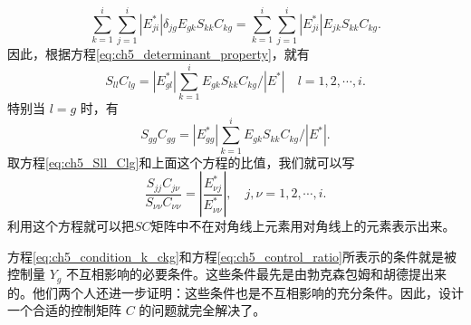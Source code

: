 \begin{equation*}
\sum_{k=1}^{i} \sum_{j=1}^{i} \left| E_{ji}^* \right| \delta_{jg} E_{gk} S_{kk} C_{kg} = \sum_{k=1}^{i} \sum_{j=1}^{i} \left| E_{ji}^* \right| E_{jk} S_{kk} C_{kg}.
\end{equation*}
因此，根据方程\eqref{eq:ch5_determinant_property}，就有
\begin{equation}\label{eq:ch5_Sll_Clg}
S_{ll} C_{lg} = \left| E_{gl}^* \right| \sum_{k=1}^{i} E_{gk} S_{kk} C_{kg} / \left| E^* \right| \quad l = 1,2,\cdots,i.
\end{equation}
特别当 $l=g$ 时，有
\begin{equation*}
S_{gg} C_{gg} = \left| E_{gg}^* \right| \sum_{k=1}^{i} E_{gk} S_{kk} C_{kg} / \left| E^* \right|.
\end{equation*}
取方程\eqref{eq:ch5_Sll_Clg}和上面这个方程的比值，我们就可以写
\begin{equation}\label{eq:ch5_control_ratio}
\frac{S_{jj} C_{j\nu}}{S_{\nu\nu} C_{\nu\nu}} = \left| \frac{E_{\nu j}^*}{E_{\nu\nu}^*} \right|, \quad j,\nu = 1,2,\cdots,i.
\end{equation}
利用这个方程就可以把$SC$矩阵中不在对角线上元素用对角线上的元素表示出来。

方程\eqref{eq:ch5_condition_k_ckg}和方程\eqref{eq:ch5_control_ratio}所表示的条件就是被控制量 $Y_g$ 不互相影响的必要条件。这些条件最先是由勃克森包姆和胡德提出来的。他们两个人还进一步证明：这些条件也是不互相影响的充分条件。因此，设计一个合适的控制矩阵 $C$ 的问题就完全解决了。

